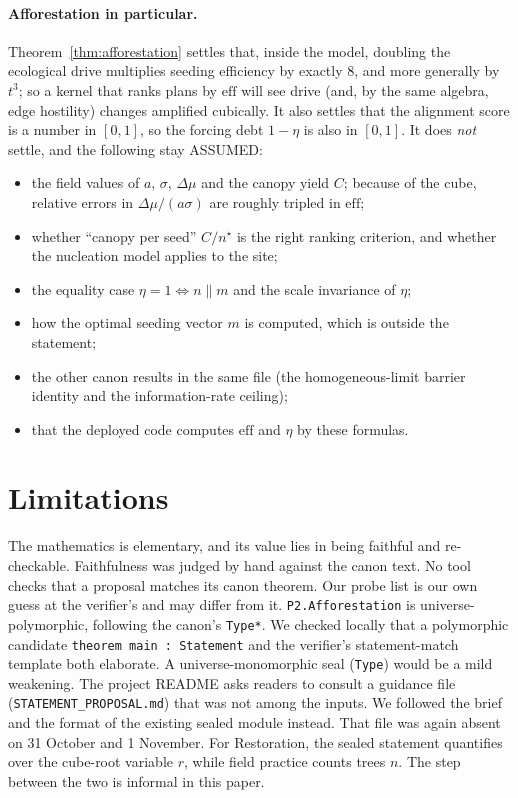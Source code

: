 \documentclass[11pt]{article}
\theoremstyle{definition}
\theoremstyle{remark}
\begin{document}
\paragraph{Afforestation in particular.} Theorem~\ref{thm:afforestation} settles that, inside the model,
doubling the ecological drive multiplies seeding efficiency by exactly $8$, and more generally by $t^3$; so a kernel that ranks
plans by $\mathrm{eff}$ will see drive (and, by the same algebra, edge hostility) changes amplified cubically. It also settles that
the alignment score is a number in $[0,1]$, so the forcing debt $1-\eta$ is also in $[0,1]$.
It does \emph{not} settle, and the following stay ASSUMED:
\begin{itemize}
\item the field values of $a$, $\sigma$, $\Delta\mu$ and the canopy yield $C$; because of the cube, relative errors in
$\Delta\mu/(a\sigma)$ are roughly tripled in $\mathrm{eff}$;
\item whether ``canopy per seed'' $C/n^\star$ is the right ranking criterion, and whether the nucleation model applies to the site;
\item the equality case $\eta=1\iff n\parallel m$ and the scale invariance of $\eta$;
\item how the optimal seeding vector $m$ is computed, which is outside the statement;
\item the other canon results in the same file (the homogeneous-limit barrier identity and the information-rate ceiling);
\item that the deployed code computes $\mathrm{eff}$ and $\eta$ by these formulas.
\end{itemize}

\section{Limitations}
The mathematics is elementary, and its value lies in being faithful and re-checkable.
Faithfulness was judged by hand against the canon text. No tool checks that a proposal matches its canon theorem.
Our probe list is our own guess at the verifier's and may differ from it.
\texttt{P2.Afforestation} is universe-polymorphic, following the canon's \texttt{Type*}. We checked locally that a polymorphic
candidate \texttt{theorem main : Statement} and the verifier's statement-match template both elaborate.
A universe-monomorphic seal (\texttt{Type}) would be a mild weakening.
The project README asks readers to consult a guidance file (\texttt{STATEMENT\_PROPOSAL.md}) that was not among the inputs.
We followed the brief and the format of the existing sealed module instead. That file was again absent on 31 October and 1 November.
For Restoration, the sealed statement quantifies over the cube-root variable $r$, while field practice counts trees $n$.
The step between the two is informal in this paper.
\end{document}
